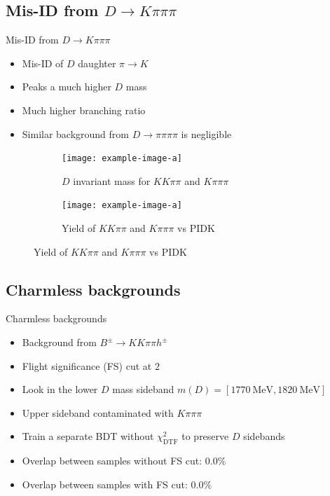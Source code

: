 \documentclass{beamer}
\begin{document}
\subsection{Mis-ID from \texorpdfstring{$D\to K\pi\pi\pi$}{D to Kpipipi}}
\begin{frame}{Mis-ID from $D\to K\pi\pi\pi$}
  \begin{itemize}
    \item{Mis-ID of $D$ daughter $\pi\to K$}
    \item{Peaks a much higher $D$ mass}
    \item{Much higher branching ratio}
    \item{Similar background from $D\to\pi\pi\pi\pi$ is negligible}
  \end{itemize}
  \begin{figure}
    \centering
    \vspace{-0.2cm}
    \begin{subfigure}{0.5\textwidth}
      \texttt{[image: example-image-a]}
      \caption{$D$ invariant mass for $KK\pi\pi$ and $K\pi\pi\pi$}
    \end{subfigure}%
    \begin{subfigure}{0.5\textwidth}
      \texttt{[image: example-image-a]}
      \caption{Yield of $KK\pi\pi$ and $K\pi\pi\pi$ vs $\text{PIDK}$}
    \end{subfigure}
  \end{figure}
\end{frame}

\subsection{Charmless backgrounds}
\begin{frame}{Charmless backgrounds}
  \begin{itemize}
    \setlength\itemsep{1.5em}
    \item{Background from $B^\pm\to KK\pi\pi h^\pm$}
    \item{Flight significance (FS) cut at $2$}
    \item{Look in the lower $D$ mass sideband $m(D) = [\SI{1770}{\mega\eV}, \SI{1820}{\mega\eV}]$}
    \item{Upper sideband contaminated with $K\pi\pi\pi$}
    \item{Train a separate BDT without $\chi^2_{\text{DTF}}$ to preserve $D$ sidebands}
    \item{Overlap between samples without FS cut: $0.0\%$}
    \item{Overlap between samples with FS cut: $0.0\%$}
  \end{itemize}
\end{frame}
\end{document}
